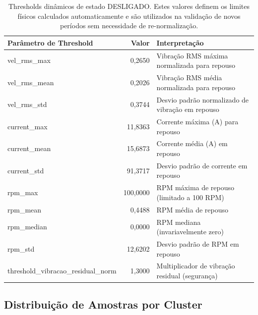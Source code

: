 \begin{table}[H]
  \centering
  \small
  \begin{tabular}{|l|r|l|}
    \hline
    \textbf{Parâmetro de Threshold}     & \textbf{Valor} & \textbf{Interpretação}                           \\
    \hline
    vel\_rms\_max                       & 0,2650         & Vibração RMS máxima normalizada para repouso     \\
    vel\_rms\_mean                      & 0,2026         & Vibração RMS média normalizada para repouso      \\
    vel\_rms\_std                       & 0,3744         & Desvio padrão normalizado de vibração em repouso \\
    current\_max                        & 11,8363        & Corrente máxima (A) para repouso                 \\
    current\_mean                       & 15,6873        & Corrente média (A) em repouso                    \\
    current\_std                        & 91,3717        & Desvio padrão de corrente em repouso             \\
    rpm\_max                            & 100,0000       & RPM máxima de repouso (limitado a 100 RPM)       \\
    rpm\_mean                           & 0,4488         & RPM média de repouso                             \\
    rpm\_median                         & 0,0000         & RPM mediana (invariavelmente zero)               \\
    rpm\_std                            & 12,6202        & Desvio padrão de RPM em repouso                  \\
    threshold\_vibracao\_residual\_norm & 1,3000         & Multiplicador de vibração residual (segurança)   \\
    \hline
  \end{tabular}
  \caption{Thresholds dinâmicos de estado DESLIGADO. Estes valores definem os limites físicos calculados automaticamente e são utilizados na validação de novos períodos sem necessidade de re-normalização.}
  \label{tab:thresholds_desligado}
\end{table}

\subsection{Distribuição de Amostras por Cluster}

